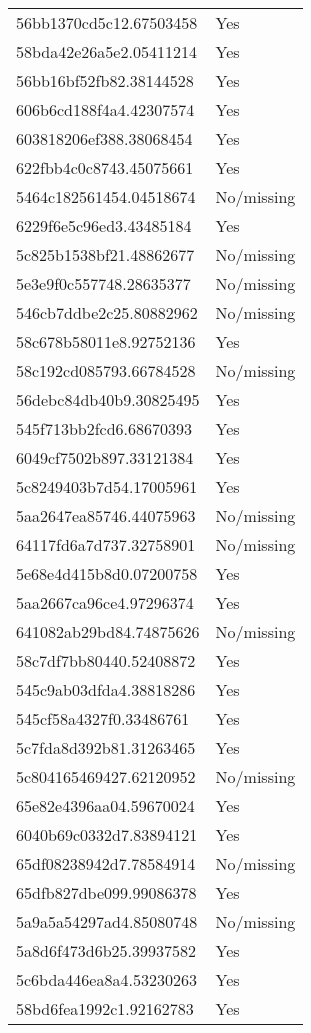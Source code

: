\begin{tabular}{ll}
56bb1370cd5c12.67503458 & Yes \\
58bda42e26a5e2.05411214 & Yes \\
56bb16bf52fb82.38144528 & Yes \\
606b6cd188f4a4.42307574 & Yes \\
603818206ef388.38068454 & Yes \\
622fbb4c0c8743.45075661 & Yes \\
5464c182561454.04518674 & No/missing \\
6229f6e5c96ed3.43485184 & Yes \\
5c825b1538bf21.48862677 & No/missing \\
5e3e9f0c557748.28635377 & No/missing \\
546cb7ddbe2c25.80882962 & No/missing \\
58c678b58011e8.92752136 & Yes \\
58c192cd085793.66784528 & No/missing \\
56debc84db40b9.30825495 & Yes \\
545f713bb2fcd6.68670393 & Yes \\
6049cf7502b897.33121384 & Yes \\
5c8249403b7d54.17005961 & Yes \\
5aa2647ea85746.44075963 & No/missing \\
64117fd6a7d737.32758901 & No/missing \\
5e68e4d415b8d0.07200758 & Yes \\
5aa2667ca96ce4.97296374 & Yes \\
641082ab29bd84.74875626 & No/missing \\
58c7df7bb80440.52408872 & Yes \\
545c9ab03dfda4.38818286 & Yes \\
545cf58a4327f0.33486761 & Yes \\
5c7fda8d392b81.31263465 & Yes \\
5c804165469427.62120952 & No/missing \\
65e82e4396aa04.59670024 & Yes \\
6040b69c0332d7.83894121 & Yes \\
65df08238942d7.78584914 & No/missing \\
65dfb827dbe099.99086378 & Yes \\
5a9a5a54297ad4.85080748 & No/missing \\
5a8d6f473d6b25.39937582 & Yes \\
5c6bda446ea8a4.53230263 & Yes \\
58bd6fea1992c1.92162783 & Yes \\

\end{tabular}
